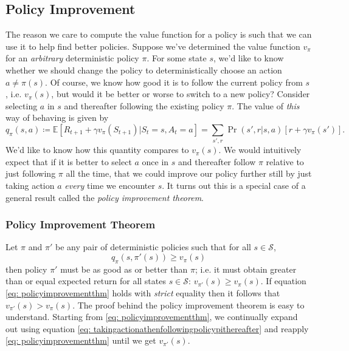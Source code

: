 \documentclass[12pt]{article}
\begin{document}
\subsection{Policy Improvement}
The reason we care to compute the value function for a policy is such that we can use it to help find better policies. Suppose we've determined the value function $v_\pi$ for an \emph{arbitrary} deterministic policy $\pi$. For some state $s$, we'd like to know whether we should change the policy to deterministically choose an action $a \neq \pi(s)$. Of course, we know how good it is to follow the current policy from $s$, i.e. $v_\pi(s)$, but would it be better or worse to switch to a new policy? Consider selecting $a$ in $s$ and thereafter following the existing policy $\pi$. The value of \emph{this} way of behaving is given by
\begin{equation}
  \label{eq: takingactionathenfollowingpolicypithereafter}
  q_\pi(s,a) \coloneqq \mathbb E \left[ R_{t+1} + \gamma v_\pi(S_{t+1}) | S_t =     s, A_t = a \right] = \sum_{s',r} \Pr(s',r | s,a) \left[ r + \gamma v_\pi(s')\right].
\end{equation}
We'd like to know how this quantity compares to $v_\pi(s)$. We would intuitively expect that if it is better to select $a$ once in $s$ and thereafter follow $\pi$ relative to just following $\pi$ all the time, that we could improve our policy further still by just taking action $a$ \emph{every} time we encounter $s$. It turns out this is a special case of a general result called the \emph{policy improvement theorem}.

\subsubsection{Policy Improvement Theorem}
Let $\pi$ and $\pi'$ be any pair of deterministic policies such that for all $s \in \mathcal S$,
\begin{equation}
  \label{eq: policyimprovementthm}
  q_\pi(s, \pi'(s)) \geq v_\pi(s)
\end{equation}
then policy $\pi'$ must be as good as or better than $\pi$; i.e. it must obtain greater than or equal expected return for all states $s \in \mathcal S$: $v_{\pi'}(s) \geq v_\pi(s)$. If equation \ref{eq: policyimprovementthm} holds with \emph{strict} equality then it follows that $v_{\pi'}(s) > v_\pi(s)$. The proof behind the policy improvement theorem is easy to understand. Starting from \ref{eq: policyimprovementthm}, we continually expand out using equation \ref{eq: takingactionathenfollowingpolicypithereafter} and reapply \ref{eq:   policyimprovementthm} until we get $v_{\pi'}(s)$.
\end{document}
